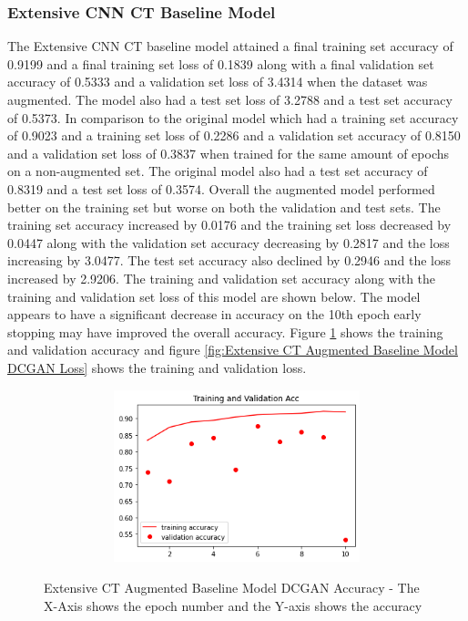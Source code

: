 \subsubsection{Extensive CNN CT Baseline Model}
The Extensive CNN CT baseline model attained a final training set accuracy of 0.9199 and a final training set loss of 0.1839 along with a final validation set accuracy of 0.5333 and a validation set loss of 3.4314  when the dataset was augmented.  The model  also had a test set loss of 3.2788  and a test set accuracy of  0.5373. In comparison to the original model which had a training set accuracy of 0.9023 and a training set loss of 0.2286 and a validation set accuracy of 0.8150 and a validation set loss of 0.3837  when trained for the same amount of epochs on a non-augmented set.  The original model also had a test set accuracy of 0.8319 and a test set loss of 0.3574.  Overall the augmented model performed better on the training set but worse on both the validation and test sets.  The training set accuracy increased by 0.0176 and the training set loss decreased by 0.0447 along with the validation set accuracy decreasing by 0.2817 and the loss increasing by 3.0477. The test set accuracy also declined by 0.2946 and the loss increased by 2.9206.  The training and validation set accuracy along with the training and validation set loss of this model are shown below.  The model appears to have a significant decrease in accuracy on the 10th epoch early stopping may have improved the overall accuracy.  Figure \ref{fig:Extensive CT Augmented Baseline Model DCGAN Accuracy} shows the training and validation accuracy and figure \ref{fig:Extensive CT Augmented Baseline Model DCGAN Loss} shows the training and validation loss.
 \begin{figure}[H]
    \centering    \includegraphics[width=1\textwidth,height=5cm,keepaspectratio]{Images/ExtensiveCNNBaselineModelExtensiveCovidAccCTAugmentedDCGAN.png}\\
    \caption{Extensive CT Augmented Baseline Model DCGAN Accuracy - The X-Axis shows the epoch number and the Y-axis shows the accuracy}
    \label{fig:Extensive CT Augmented Baseline Model DCGAN Accuracy}
\end{figure}
